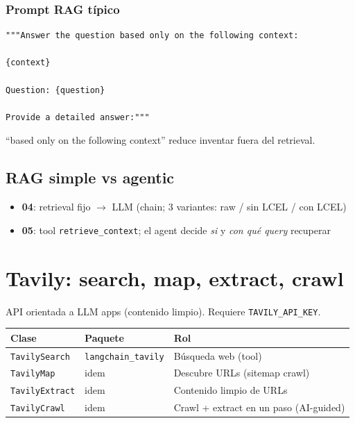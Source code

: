 \documentclass[11pt,a4paper]{article}
\begin{document}
\subsubsection{Prompt RAG típico}
\begin{lstlisting}
"""Answer the question based only on the following context:

{context}

Question: {question}

Provide a detailed answer:"""
\end{lstlisting}

``based only on the following context'' reduce inventar fuera del retrieval.

\subsection{RAG simple vs agentic}
\begin{itemize}[leftmargin=*]
  \item \textbf{04}: retrieval fijo $\to$ LLM (chain; 3 variantes: raw / sin LCEL / con LCEL)
  \item \textbf{05}: tool \texttt{retrieve\_context}; el agent decide \emph{si} y \emph{con qué query} recuperar
\end{itemize}

\section{Tavily: search, map, extract, crawl}

API orientada a LLM apps (contenido limpio). Requiere \texttt{TAVILY\_API\_KEY}.

\begin{center}
\begin{tabular}{@{}llp{6.8cm}@{}}
\toprule
\textbf{Clase} & \textbf{Paquete} & \textbf{Rol} \\
\midrule
\texttt{TavilySearch} & \texttt{langchain\_tavily} & Búsqueda web (tool) \\
\texttt{TavilyMap} & idem & Descubre URLs (sitemap crawl) \\
\texttt{TavilyExtract} & idem & Contenido limpio de URLs \\
\texttt{TavilyCrawl} & idem & Crawl + extract en un paso (AI-guided) \\
\bottomrule
\end{tabular}
\end{center}
\end{document}
